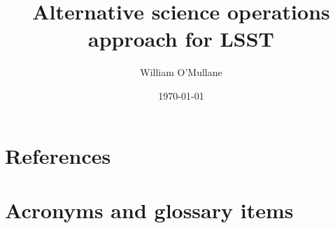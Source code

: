\documentclass[OPS,authoryear,toc]{lsstdoc}
\title{Alternative science operations approach for  LSST }
\author{%
William O'Mullane
}
\date{\today}
\begin{document}

\mkshorttitle




\appendix
\section{References} \label{sec:bib}


\section{Acronyms and glossary items}\label{sec:acronyms}

\end{document}
